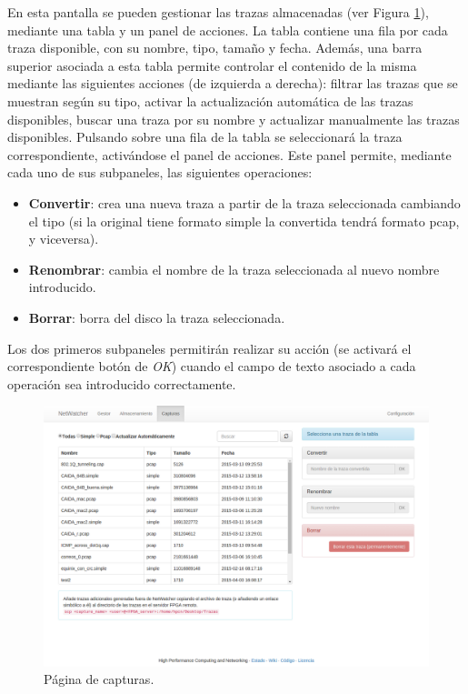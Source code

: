 En esta pantalla se pueden gestionar las \glspl{traza} almacenadas (ver Figura \ref{fig:captura:capturas}), mediante una tabla y un panel de acciones. La tabla contiene una fila por cada \gls{traza} disponible, con su nombre, tipo, tamaño y fecha. Además, una barra superior asociada a esta tabla permite controlar el contenido de la misma mediante las siguientes acciones (de izquierda a derecha): filtrar las \glspl{traza} que se muestran según su tipo, activar la actualización automática de las \glspl{traza} disponibles, buscar una \gls{traza} por su nombre y actualizar manualmente las \glspl{traza} disponibles. Pulsando sobre una fila de la tabla se seleccionará la \gls{traza} correspondiente, activándose el panel de acciones. Este panel permite, mediante cada uno de sus subpaneles, las siguientes operaciones:
\begin{itemize}
  \item \textbf{Convertir}: crea una nueva \gls{traza} a partir de la \gls{traza} seleccionada cambiando el tipo (si la original tiene formato \gls{simple} la convertida tendrá formato \gls{pcap}, y viceversa).
  \item \textbf{Renombrar}: cambia el nombre de la \gls{traza} seleccionada al nuevo nombre introducido.
  \item \textbf{Borrar}: borra del disco la \gls{traza} seleccionada.
\end{itemize}

Los dos primeros subpaneles permitirán realizar su acción (se activará el correspondiente botón de \textit{OK}) cuando el campo de texto asociado a cada operación sea introducido correctamente.

\begin{figure}[!htp]
  \centering
  \includegraphics[width=\textwidth,clip=true]{graphics/capturas/capturas}
  \caption{Página de capturas.}
  \label{fig:captura:capturas}
\end{figure}


